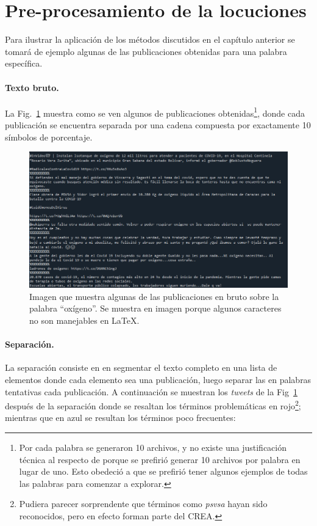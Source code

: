 \section{Pre-procesamiento de la locuciones}

Para ilustrar la aplicación de los métodos discutidos en el capítulo anterior se tomará de ejemplo algunas de las publicaciones obtenidas para una palabra específica. 

\paragraph{Texto bruto.} La Fig.~\ref{fig:tweets_raw} muestra como se ven algunos de publicaciones obtenidas\footnote{Por cada palabra se generaron 10 archivos, y no existe una justificación técnica al respecto de porque se prefirió generar 10 archivos por palabra en lugar de uno. Esto obedeció a que se prefirió tener algunos ejemplos de todas las palabras para comenzar a explorar.}, donde cada publicación se encuentra separada por una cadena compuesta por exactamente 10 símbolos de porcentaje.

\begin{figure}[h]
	\centering
	\includegraphics[width=0.95\linewidth]{img/tweets_raw}
	\caption{Imagen que muestra algunas de las publicaciones en bruto sobre la palabra ``oxígeno''. Se muestra en imagen porque algunos caracteres no son manejables en \LaTeX.}
	\label{fig:tweets_raw}
\end{figure}

\paragraph{Separación.} La separación consiste en en segmentar el texto completo en una lista de elementos donde cada elemento sea una publicación, luego separar las en palabras tentativas cada publicación. A continuación se muestran los \textit{tweets} de la Fig~\ref{fig:tweets_raw} después de la separación donde se resaltan los términos problemáticas en rojo\footnote{Pudiera parecer sorprendente que términos como \textit{psvsa} hayan sido reconocidos, pero en efecto forman parte del CREA.}; mientras que en azul se resultan los términos poco frecuentes:

